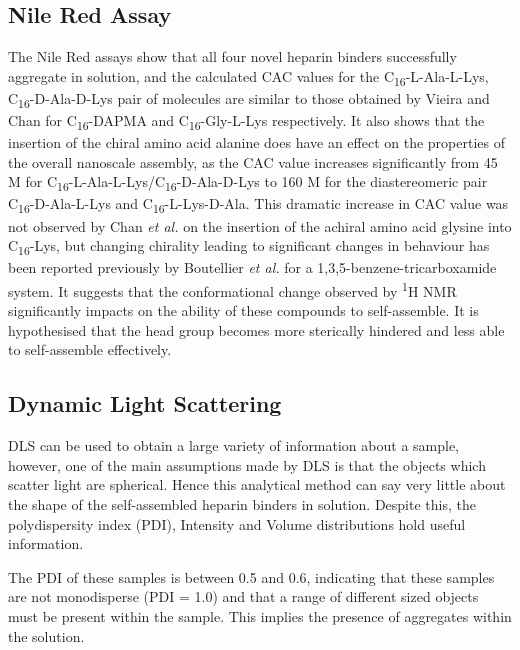 \subsection{Nile Red Assay}
The Nile Red assays show that all four novel heparin binders successfully aggregate in solution, and the calculated CAC values for the C\textsubscript{16}-L-Ala-L-Lys, C\textsubscript{16}-D-Ala-D-Lys pair of molecules are similar to those obtained by Vieira and Chan for C\textsubscript{16}-DAPMA and C\textsubscript{16}-Gly-L-Lys respectively.\textsuperscript{\cite{Vieira2017EmergenceHeparin,Chan2016ChiralBinding}}
It also shows that the insertion of the chiral amino acid alanine does have an effect on the properties of the overall nanoscale assembly, as the CAC value increases significantly from 45 \textmu M for C\textsubscript{16}-L-Ala-L-Lys/C\textsubscript{16}-D-Ala-D-Lys to 160 \textmu M for the diastereomeric pair C\textsubscript{16}-D-Ala-L-Lys and C\textsubscript{16}-L-Lys-D-Ala. This dramatic increase in CAC value was not observed by Chan \textit{et al.} on the insertion of the achiral amino acid glysine into C\textsubscript{16}-Lys, but changing chirality leading to significant changes in behaviour has been reported previously by Boutellier \textit{et al.} for a 1,3,5-benzene-tricarboxamide system.\textsuperscript{\cite{Chan2016ChiralBinding,Caumes2016TuningStereochemistry}} It suggests that the conformational change observed by \textsuperscript{1}H NMR significantly impacts on the ability of these compounds to self-assemble. It is hypothesised that the head group becomes more sterically hindered and less able to self-assemble effectively. 

\subsection{Dynamic Light Scattering}
DLS can be used to obtain a large variety of information about a sample, however, one of the main assumptions made by DLS is that the objects which scatter light are spherical. Hence this analytical method can say very little about the shape of the self-assembled heparin binders in solution. Despite this, the polydispersity index (PDI), Intensity and Volume distributions hold useful information. 

The PDI of these samples is between 0.5 and 0.6, indicating that these samples are not monodisperse (PDI = 1.0) and that a range of different sized objects must be present within the sample. This implies the presence of aggregates within the solution. 

